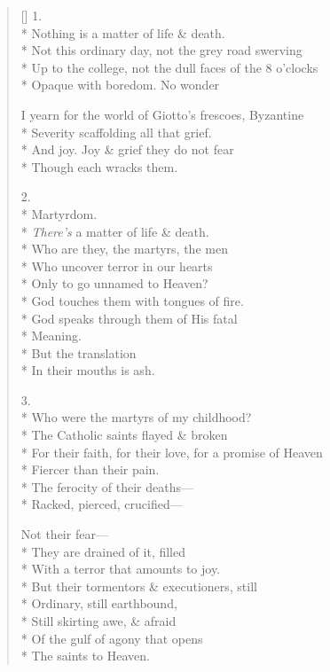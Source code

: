 \label{ch:lives_of_the_saints}
\settowidth{\versewidth}{For their faith, for their love, for a promise of Heaven}
\begin{verse}[\versewidth]
1.\\*
Nothing is a matter of life \& death.\\*
Not this ordinary day, not the grey road swerving\\*
Up to the college, not the dull faces of the 8 o'clocks\\*
Opaque with boredom.   No wonder

I yearn for the world of Giotto's frescoes, Byzantine\\*
Severity scaffolding all that grief.\\*
And joy. Joy \& grief they do not fear\\*
Though each wracks them.

2.\\*
Martyrdom.\\*
\textit{There's} a matter of life \& death.\\*
Who are they, the martyrs, the men\\*
Who uncover terror in our hearts\\*
Only to go unnamed to Heaven?\\*
God touches them with tongues of fire.\\*
God speaks through them of His fatal\\*
Meaning.\\*
 But the translation\\*
In their mouths is ash.

3.\\*
Who were the martyrs of my childhood?\\*
The Catholic saints flayed \& broken\\*
For their faith, for their love, for a promise of Heaven\\*
Fiercer than their pain.\\*
The ferocity of their deaths---\\*
Racked, pierced, crucified---

Not their fear---\\*
They are drained of it, filled\\*
With a terror that amounts to joy.\\*
But their tormentors \& executioners, still\\*
Ordinary, still earthbound,\\*
Still skirting awe, \& afraid\\*
Of the gulf of agony that opens\\*
The saints to Heaven.


\end{verse}
